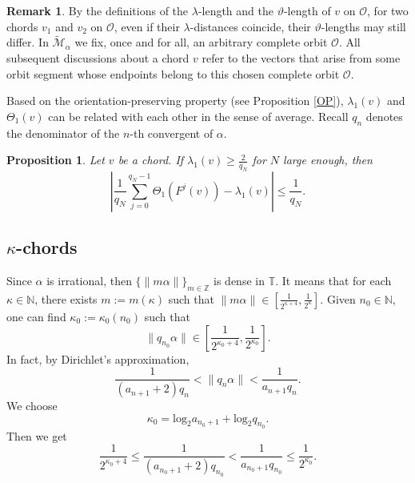 \documentclass{amsart}
\newtheorem{Proposition}[Definition]{Proposition}
\theoremstyle{definition}
\newtheorem{Remark}[Definition]{Remark}
\begin{document}
\begin{Remark}
	By the definitions of the $\lambda$-length and the $\vartheta$-length of $v$ on $\mathcal{O}$, for two chords $v_1$ and $v_2$ on $\mathcal{O}$, even if their $\lambda$-distances coincide, their $\vartheta$-lengths may still differ.
	In $\widetilde{\mathcal{M}}_\alpha$ we fix, once and for all, an arbitrary complete orbit $\mathcal{O}$.
	All subsequent discussions about a chord $v$ refer to the vectors that arise from some orbit segment whose endpoints belong to this chosen complete orbit $\mathcal{O}$.
\end{Remark}

Based on the orientation-preserving property (see Proposition \ref{OP}),  $\lambda_1(v)$ and $\Theta_1(v)$ can be related with each other in the sense of average. Recall \( q_n \) denotes the denominator of the \(n\)-th convergent of \( \alpha \).



\begin{Proposition}\label{eveco}Let $v$ be a chord. If $\lambda_1(v)\geq\frac{2}{q_N}$ for $N$ large enough, then
\[\left|\frac{1}{q_N}\sum_{j=0}^{q_N-1}\Theta_1(F^j(v))-\lambda_1(v)\right|\leq \frac{1}{q_N}.\]
\end{Proposition}



\subsection{$\kappa$-chords}
Since $\alpha$ is irrational, then $\{\|m\alpha\|\}_{m\in \mathbb{Z}}$ is dense in $\mathbb{T}$. It means that for each $\kappa\in \mathbb{N}$, there exists $m:=m(\kappa)$ such that $\|m\alpha\|\in  [\frac{1}{2^{\kappa+4}},\frac{1}{2^\kappa}]$.
Given $n_0\in \mathbb{N}$, one can find $\kappa_0:=\kappa_0(n_0)$ such that
\begin{equation}\label{qn}
\|q_{n_0}\alpha\|\in \left[\frac{1}{2^{\kappa_0+4}},\frac{1}{2^{\kappa_0}}\right].
\end{equation}
In fact, by Dirichlet's approximation,
\begin{equation}\label{DA}
\frac{1}{(a_{n+1}+2)q_n}<\|q_n\alpha\|<\frac{1}{a_{n+1}q_n}.
\end{equation}
We choose
\begin{equation}\label{k0}
\kappa_0=\mathrm{log}_2a_{n_0+1}+\mathrm{log}_2q_{n_0}.
\end{equation}
Then we get
\[\frac{1}{2^{\kappa_0+4}}\leq \frac{1}{(a_{n_0+1}+2)q_{n_0}}<\frac{1}{a_{n_0+1}q_{n_0}}\leq \frac{1}{2^{\kappa_0}}.\]
\end{document}
